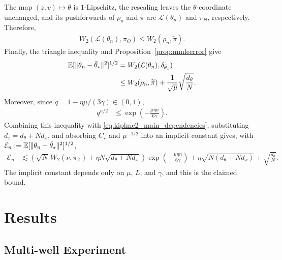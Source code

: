 The map $(z,v)\mapsto\theta$ is $1$-Lipschitz, the rescaling leaves the $\theta$-coordinate unchanged, and its pushforwards of $\rho_n$ and $\widetilde\pi$ are $\mathcal L(\theta_n)$ and $\pi_\Theta$, respectively.  Therefore,
\begin{align*}
W_2(\mathcal L(\theta_n),\pi_\Theta)
\leq W_2(\rho_n,\widetilde\pi).
\end{align*}
Finally, the triangle inequality and Proposition~\ref{prop:mmleerror} give
\begin{align*}
{\mathbb E}[\|\theta_n-\bar\theta_\star\|^2]^{1/2}
&=W_2(\mathcal L(\theta_n),\delta_{\bar\theta_\star})\\
&\leq W_2(\rho_n,\widetilde\pi)
+\frac{1}{\sqrt\mu}\sqrt{\frac{d_\theta}{N}}.
\end{align*}
Moreover, since $q=1-\eta\mu/(3\gamma)\in(0,1)$,
\begin{align*}
q^{n/2}
&\leq\exp\left(-\frac{\mu\eta n}{6\gamma}\right).
\end{align*}
Combining this inequality with \eqref{eq:kiplmc2_main_dependencies}, substituting $d_z=d_\theta+Nd_x$, and absorbing $C_\star$ and $\mu^{-1/2}$ into an implicit constant gives, with $\mathcal E_n:={\mathbb E}[\|\theta_n-\bar\theta_\star\|^2]^{1/2}$,
\begin{align*}
\mathcal E_n
&\lesssim \left(\sqrt N\,W_2(\nu,\widetilde\pi_Z)
+ \eta N\sqrt{d_\theta+Nd_x}\right)\exp\left(-\frac{\mu\eta n}{6\gamma}\right)+\eta\sqrt{N(d_\theta+Nd_x)}
+\sqrt{\frac{d_\theta}{N}}.
\end{align*}
The implicit constant depends only on $\mu$, $L$, and $\gamma$, and this is the claimed bound.


\section{Results}


\subsection{Multi-well Experiment}\label{sec:multiwell}

